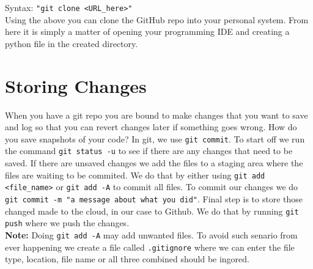 \documentclass[12pt, a4paper]{article}
\begin{document}
Syntax: \verb+"git clone <URL_here>"+ \\

Using the above you can clone the GitHub repo into your personal system. From here it is simply a matter of opening your programming IDE and creating a python file in the created directory.

\section{Storing Changes}
When you have a git repo you are bound to make changes that you want to save and log so that you can revert changes later if something goes wrong. How do you save snapshots of your code? In git, we use \texttt{git commit}. To start off we run the command \texttt{git status -u} to see if there are any changes that need to be saved. If there are unsaved changes we add the files to a staging area where the files are waiting to be commited. We do that by either using \texttt{git add <file\_name>} or \texttt{git add -A} to commit all files. To commit our changes we do \texttt{git commit -m "a message about what you did"}. Final step is to store those changed made to the cloud, in our case to Github. We do that by running \texttt{git push} where we push the changes.\\

\textbf{Note:} Doing \texttt{git add -A} may add unwanted files. To avoid such senario from ever happening we create a file called \verb+.gitignore+ where we can enter the file type, location, file name or all three combined should be ingored.
\end{document}
